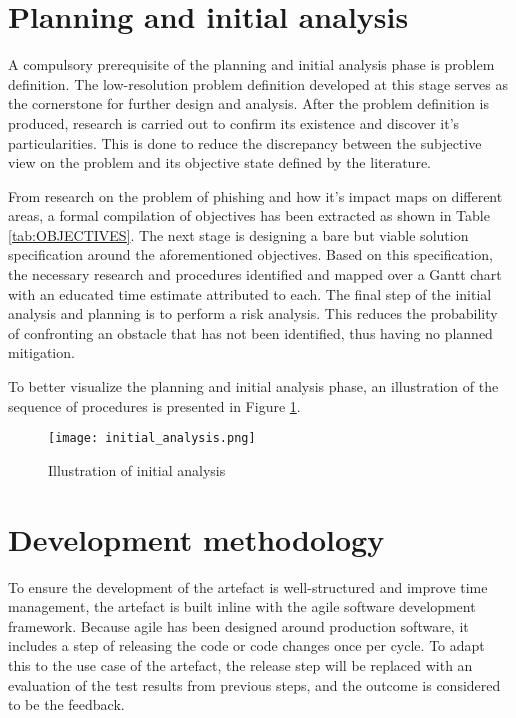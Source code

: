 \section{Planning and initial analysis}
A compulsory prerequisite of the planning and initial analysis phase is problem definition. The low-resolution problem definition developed at this stage serves as the cornerstone for further design and analysis. After the problem definition is produced, research is carried out to confirm its existence and discover it's particularities. This is done to reduce the discrepancy between the subjective view on the problem and its objective state defined by the literature.

From research on the problem of phishing and how it's impact maps on different areas, a formal compilation of objectives has been extracted as shown in Table \ref{tab:OBJECTIVES}. The next stage is designing a bare but viable solution specification around the aforementioned objectives. Based on this specification, the necessary research and procedures identified and mapped over a Gantt chart with an educated time estimate attributed to each. The final step of the initial analysis and planning is to perform a risk analysis. This reduces the probability of confronting an obstacle that has not been identified, thus having no planned mitigation.

To better visualize the planning and initial analysis phase, an illustration of the sequence of procedures is presented in Figure \ref{fig:INITIAL_ANALYSIS}.

\begin{figure}
	\centering
	\texttt{[image: initial\_analysis.png]}
	\caption{Illustration of initial analysis}
	\label{fig:INITIAL_ANALYSIS}
\end{figure}

\section{Development methodology}
To ensure the development of the artefact is well-structured and improve time management, the artefact is built inline with the agile software development framework. Because agile has been designed around production software, it includes a step of releasing the code or code changes once per cycle. To adapt this to the use case of the artefact, the release step will be replaced with an evaluation of the test results from previous steps, and the outcome is considered to be the feedback.

